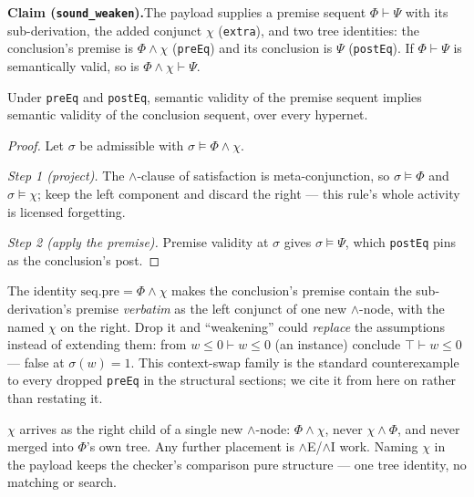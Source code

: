 

\textbf{Claim (\texttt{sound\_weaken}).}\enspace The payload supplies a
premise sequent $\Phi \vdash \Psi$ with its sub-derivation, the added
conjunct $\chi$ (\texttt{extra}), and two tree identities: the
conclusion's premise is $\Phi \wedge \chi$ (\texttt{preEq}) and its
conclusion is $\Psi$ (\texttt{postEq}). If $\Phi \vdash \Psi$ is
semantically valid, so is $\Phi \wedge \chi \vdash \Psi$.

\begin{bthm}\label{thm:weaken-sound}
Under \texttt{preEq} and \texttt{postEq}, semantic validity of the
premise sequent implies semantic validity of the conclusion sequent,
over every hypernet.
\end{bthm}
\begin{proof}
Let $\sigma$ be admissible with $\sigma \models \Phi \wedge \chi$.

\emph{Step 1 (project).} The $\wedge$-clause of satisfaction is
meta-conjunction, so $\sigma \models \Phi$ and $\sigma \models \chi$;
keep the left component and discard the right --- this rule's whole
activity is licensed forgetting.

\emph{Step 2 (apply the premise).} Premise validity at $\sigma$ gives
$\sigma \models \Psi$, which \texttt{postEq} pins as the conclusion's
post.
\end{proof}

\begin{bremark}
\label{rem:weaken-preeq}
The identity $\mathrm{seq.pre} = \Phi \wedge \chi$ makes the conclusion's
premise contain the sub-derivation's premise \emph{verbatim} as the left
conjunct of one new $\wedge$-node, with the named $\chi$ on the right.
Drop it and ``weakening'' could \emph{replace} the assumptions instead of
extending them: from $w \leq 0 \vdash w \leq 0$ (an 
instance) conclude $\top \vdash w \leq 0$ --- false at $\sigma(w) = 1$.
This context-swap family is the standard counterexample to every dropped
\texttt{preEq} in the structural sections; we cite it from here on
rather than restating it.
\end{bremark}

\begin{bremark}
$\chi$ arrives as the right child of a single new $\wedge$-node:
$\Phi \wedge \chi$, never $\chi \wedge \Phi$, and never merged into
$\Phi$'s own tree. Any further placement is $\wedge$E/$\wedge$I work.
Naming $\chi$ in the payload keeps the checker's comparison pure
structure --- one tree identity, no matching or search.
\end{bremark}

